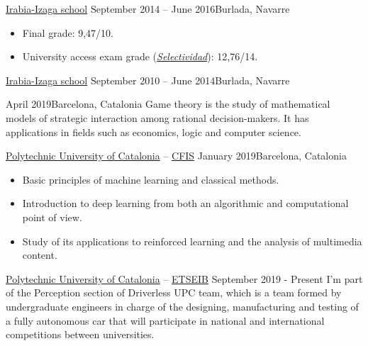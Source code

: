\documentclass[10pt, a4paper, ragged2e]{altacv}
\begin{document}
\divider

{\href{https://www.irabia-izaga.org}{Irabia-Izaga school}}
{September 2014 -- June 2016}{Burlada, Navarre}
\begin{itemize}
  \item Final grade: 9,47/10.
  \item University access exam grade
  (\href{https://en.wikipedia.org/wiki/Selectividad}{\textit{Selectividad}}):
  12,76/14.
\end{itemize}

\divider

{\href{https://www.irabia-izaga.org}{Irabia-Izaga school}}
{September 2010 -- June 2014}{Burlada, Navarre}

\medskip
{}

{April 2019}{Barcelona, Catalonia}
Game theory is the study of mathematical models of strategic interaction among
rational decision-makers. It has applications in fields such as economics, logic
and computer science.

\vspace{.1cm}
\divider
\vspace{.15cm}

{\href{https://www.upc.edu/en}{Polytechnic University of Catalonia} --
  \href{https://cfis.upc.edu}{CFIS}}
{January 2019}{Barcelona, Catalonia}
\begin{itemize}
  \item Basic principles of machine learning and classical methods.
  \item Introduction to deep learning from both an algorithmic and computational
  point of view.
  \item Study of its applications to reinforced learning and the analysis of
  multimedia content.
\end{itemize}


\clearpage


{\href{https://www.upc.edu/en}{Polytechnic University of Catalonia} --
\href{https://etseib.upc.edu/en}{ETSEIB}}
{September 2019 - Present}{}
I'm part of the Perception section of Driverless UPC team, which is a team
formed by undergraduate engineers in charge of the designing, manufacturing and
testing of a fully autonomous car that will participate in national and
international competitions between universities.
\end{document}
